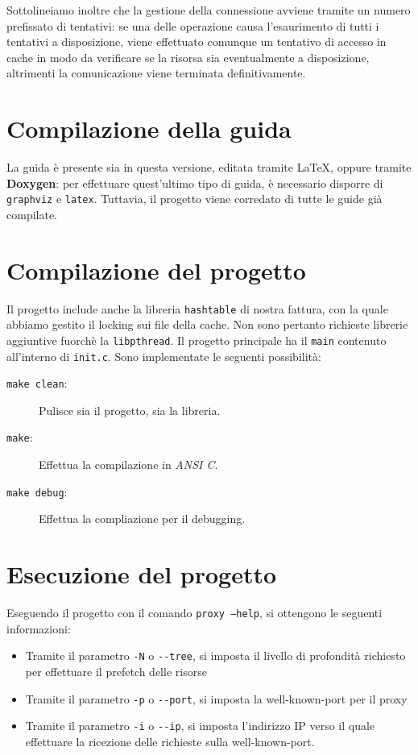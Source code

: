 Sottolineiamo inoltre che la gestione della connessione avviene tramite un numero
prefissato di tentativi: se una delle operazione causa l'esaurimento di tutti 
i tentativi a disposizione, viene effettuato comunque un tentativo di accesso
in cache in modo da verificare se la risorsa sia eventualmente a disposizione,
altrimenti la comunicazione viene terminata definitivamente.

\section{Compilazione della guida}
La guida è presente sia in questa versione, editata tramite \LaTeX, oppure
tramite \textbf{Doxygen}: per effettuare quest'ultimo tipo di guida, è necessario
disporre di \texttt{graphviz} e \texttt{latex}. Tuttavia, il progetto viene corredato
di tutte le guide già compilate.

\section{Compilazione del progetto}
Il progetto include anche la libreria \texttt{hashtable} di nostra fattura, con la 
quale abbiamo gestito il locking sui file della cache. Non sono pertanto richieste 
librerie aggiuntive fuorchè la \texttt{libpthread}. Il progetto principale 
ha il \texttt{main} contenuto all'interno di \texttt{init.c}. Sono implementate le 
seguenti possibilità:
\begin{description}
\item[\texttt{make clean}:] Pulisce sia il progetto, sia la libreria.
\item[\texttt{make}:] Effettua la compilazione in \textit{ANSI C}.
\item[\texttt{make debug}:] Effettua la compliazione per il debugging.
\end{description}


\section{Esecuzione del progetto}
Eseguendo il progetto con il comando \texttt{proxy --help}, si ottengono le seguenti
informazioni:
\begin{itemize}
\item Tramite il parametro \texttt{-N} o \texttt{-}\texttt{-tree}, si imposta il livello di
	profondità richiesto per effettuare il prefetch delle risorse
\item Tramite il parametro \texttt{-p} o \texttt{-}\texttt{-port}, si imposta la well-known-port
	per il proxy
\item Tramite il parametro \texttt{-i} o \texttt{-}\texttt{-ip}, si imposta l'indirizzo IP verso
	il quale effettuare la ricezione delle richieste sulla well-known-port.
\end{itemize}
